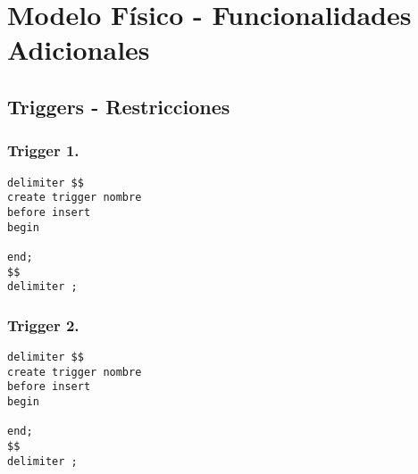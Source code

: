 \section{Modelo F\'isico - Funcionalidades Adicionales}

\subsection{Triggers - Restricciones}
\subsubsection{Trigger 1.}

\begin{verbatim}
delimiter $$
create trigger nombre
before insert 
begin

end;
$$
delimiter ;
\end{verbatim}

\subsubsection{Trigger 2.}
 
\begin{verbatim}
delimiter $$
create trigger nombre
before insert 
begin

end;
$$
delimiter ;
\end{verbatim}